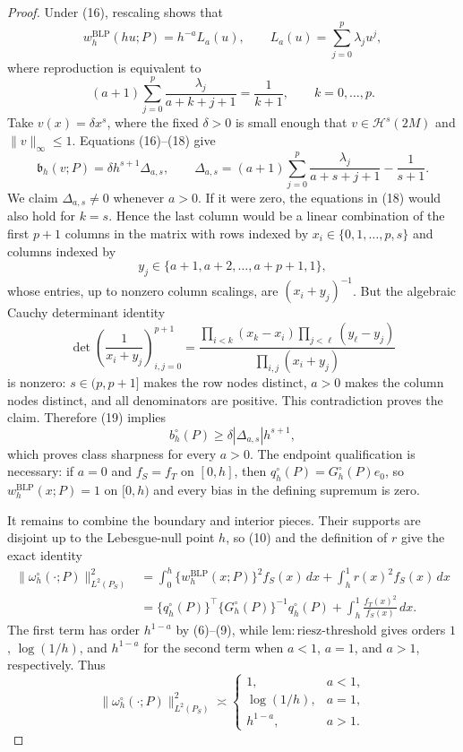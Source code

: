 \documentclass{article}
\begin{document}
\begin{proof}
Under (16), rescaling shows that
\[
w_h^{\mathrm{BLP}}(hu;P)=h^{-a}L_a(u),
\qquad
L_a(u)=\sum_{j=0}^p\lambda_ju^j,
\tag{17}
\]
where reproduction is equivalent to
\[
(a+1)\sum_{j=0}^p\frac{\lambda_j}{a+k+j+1}=\frac1{k+1},
\qquad k=0,\ldots,p.
\tag{18}
\]
Take \(v(x)=\delta x^s\), where the fixed \(\delta>0\) is small enough that
\(v\in\mathcal H^s(2M)\) and \(\|v\|_\infty\le1\). Equations (16)--(18) give
\[
\mathfrak b_h(v;P)=\delta h^{s+1}\Delta_{a,s},
\qquad
\Delta_{a,s}=(a+1)\sum_{j=0}^p\frac{\lambda_j}{a+s+j+1}-\frac1{s+1}.
\tag{19}
\]
We claim \(\Delta_{a,s}\ne0\) whenever \(a>0\). If it were zero, the equations in (18) would also hold for \(k=s\). Hence the last column would be a linear combination of the first \(p+1\) columns in the matrix with rows indexed by \(x_i\in\{0,1,\ldots,p,s\}\) and columns indexed by
\[
y_j\in\{a+1,a+2,\ldots,a+p+1,1\},
\]
whose entries, up to nonzero column scalings, are \((x_i+y_j)^{-1}\). But the algebraic Cauchy determinant identity
\[
\det\left(\frac1{x_i+y_j}\right)_{i,j=0}^{p+1}
=
\frac{\prod_{i<k}(x_k-x_i)\prod_{j<\ell}(y_\ell-y_j)}
{\prod_{i,j}(x_i+y_j)}
\tag{20}
\]
is nonzero: \(s\in(p,p+1]\) makes the row nodes distinct, \(a>0\) makes the column nodes distinct, and all denominators are positive. This contradiction proves the claim. Therefore (19) implies
\[
b_h^{\circ}(P)\ge\delta|\Delta_{a,s}|h^{s+1},
\tag{21}
\]
which proves class sharpness for every \(a>0\). The endpoint qualification is necessary: if \(a=0\) and \(f_S=f_T\) on \([0,h]\), then \(q_h^{\circ}(P)=G_h^{\circ}(P)e_0\), so \(w_h^{\mathrm{BLP}}(x;P)=1\) on \([0,h)\) and every bias in the defining supremum is zero.

It remains to combine the boundary and interior pieces. Their supports are disjoint up to the Lebesgue-null point \(h\), so (10) and the definition of \(r\) give the exact identity
\[
\begin{aligned}
\|\omega_h^{\circ}(\cdot;P)\|_{L^2(P_S)}^2
&=\int_0^h\{w_h^{\mathrm{BLP}}(x;P)\}^2f_S(x)\,dx
  +\int_h^1r(x)^2f_S(x)\,dx\\
&=\{q_h^{\circ}(P)\}^\top\{G_h^{\circ}(P)\}^{-1}q_h^{\circ}(P)
  +\int_h^1\frac{f_T(x)^2}{f_S(x)}\,dx.
\end{aligned}
\tag{22}
\]
The first term has order \(h^{1-a}\) by (6)--(9), while
\(\mathrm{lem:riesz\text{-}threshold}\) gives orders \(1\), \(\log(1/h)\), and
\(h^{1-a}\) for the second term when \(a<1\), \(a=1\), and \(a>1\), respectively. Thus
\[
\|\omega_h^{\circ}(\cdot;P)\|_{L^2(P_S)}^2\asymp
\begin{cases}
1,&a<1,\\
\log(1/h),&a=1,\\
h^{1-a},&a>1.
\end{cases}
\tag{23}
\]


\end{proof}
\end{document}
